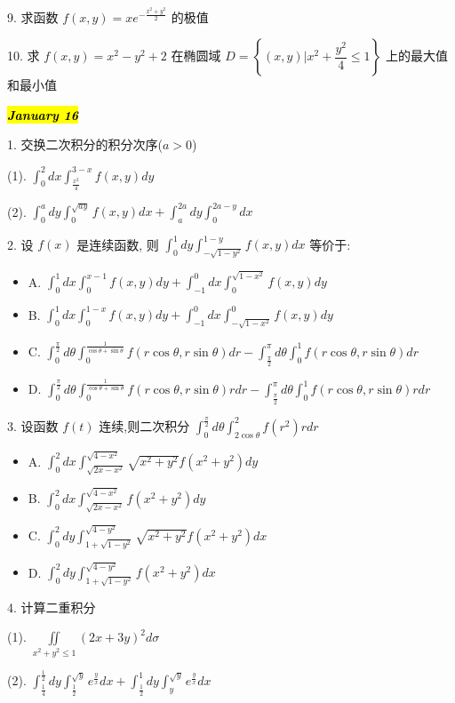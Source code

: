9. 求函数 $f(x,y)=xe^{-\frac{x^{2}+y^{2}}{2}}$ 的极值

10. 求 $f(x,y)=x^{2}-y^{2}+2$ 在椭圆域 $D=\left\lbrace (x,y)|x^{2}+\dfrac{y^{2}}{4}\leq 1\right\rbrace$ 上的最大值和最小值

\hl{\textbf{\textit{January 16}}}

1. 交换二次积分的积分次序($a>0$)

(1). $\int_{0}^{2}dx\int_{\frac{x^{2}}{4}}^{3-x}f(x,y)dy$

(2). $\int_{0}^{a}dy\int_{0}^{\sqrt{ay}}f(x,y)dx+\int_{a}^{2a}dy\int_{0}^{2a-y}dx$

2. 设 $f(x)$ 是连续函数, 则 $\int_{0}^{1}dy\int_{-\sqrt{1-y^{2}}}^{1-y}f(x,y)dx$ 等价于:
\begin{itemize}
	\item A. $\int_{0}^{1}dx\int_{0}^{x-1}f(x,y)dy+\int_{-1}^{0}dx\int_{0}^{\sqrt{1-x^{2}}}f(x,y)dy$
	\item B. $\int_{0}^{1}dx\int_{0}^{1-x}f(x,y)dy+\int_{-1}^{0}dx\int_{-\sqrt{1-x^{2}}}^{0}f(x,y)dy$
	\item C. $\int_{0}^{\frac{\pi}{2}}d\theta\int_{0}^{\frac{1}{\cos\theta+\sin\theta}}f(r\cos\theta,r\sin\theta)dr-\int_{\frac{\pi}{2}}^{\pi}d\theta\int_{0}^{1}f(r\cos\theta,r\sin\theta)dr$
	\item D. $\int_{0}^{\frac{\pi}{2}}d\theta\int_{0}^{\frac{1}{\cos\theta+\sin\theta}}f(r\cos\theta,r\sin\theta)rdr-\int_{\frac{\pi}{2}}^{\pi}d\theta\int_{0}^{1}f(r\cos\theta,r\sin\theta)rdr$
\end{itemize}

3. 设函数 $f(t)$ 连续,则二次积分 $\int_{0}^{\frac{\pi}{2}}d\theta\int_{2\cos\theta}^{2}f(r^{2})rdr$
\begin{itemize}
	\item A. $\int_{0}^{2}dx\int_{\sqrt{2x-x^{2}}}^{\sqrt{4-x^{2}}}\sqrt{x^{2}+y^{2}}f(x^{2}+y^{2})dy$
	\item B. $\int_{0}^{2}dx\int_{\sqrt{2x-x^{2}}}^{\sqrt{4-x^{2}}}f(x^{2}+y^{2})dy$
	\item C. $\int_{0}^{2}dy\int_{1+\sqrt{1-y^{2}}}^{\sqrt{4-y^{2}}}\sqrt{x^{2}+y^{2}}f(x^{2}+y^{2})dx$
	\item D. $\int_{0}^{2}dy\int_{1+\sqrt{1-y^{2}}}^{\sqrt{4-y^{2}}}f(x^{2}+y^{2})dx$
\end{itemize}

4. 计算二重积分

(1). $\iint\limits_{x^{2}+y^{2}\leq 1}(2x+3y)^{2}d\sigma$

(2). $\int_{\frac{1}{4}}^{\frac{1}{2}}dy\int_{\frac{1}{2}}^{\sqrt{y}}e^{\frac{y}{x}}dx+\int_{\frac{1}{2}}^{1}dy\int_{y}^{\sqrt{y}}e^{\frac{y}{x}}dx$

